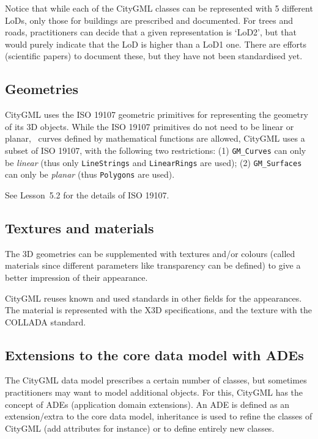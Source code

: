 %

Notice that while each of the CityGML classes can be represented with 5 different LoDs, only those for buildings are prescribed and documented.
For trees and roads, practitioners can decide that a given representation is `LoD2', but that would purely indicate that the LoD is higher than a LoD1 one.
There are efforts (scientific papers) to document these, but they have not been standardised yet.


\subsection{Geometries}

CityGML uses the ISO 19107 geometric primitives for representing the geometry of its 3D objects.
While the ISO 19107 primitives do not need to be linear or planar, \ie\ curves defined by mathematical functions are allowed, CityGML uses a subset of ISO 19107, with the following two restrictions: (1) \texttt{GM\_Curves} can only be \emph{linear} (thus only \texttt{LineStrings} and \texttt{LinearRings} are used); (2) \texttt{GM\_Surfaces} can only be \emph{planar} (thus \texttt{Polygons} are used).

See Lesson~5.2 for the details of ISO 19107.


\subsection{Textures and materials}
The 3D geometries can be supplemented with textures and/or colours (called materials since different parameters like transparency can be defined) to give a better impression of their appearance.

CityGML reuses known and used standards in other fields for the appearances.
The material is represented with the X3D specifications, and the texture with the COLLADA standard.


\subsection{Extensions to the core data model with ADEs} 

The CityGML data model prescribes a certain number of classes, but sometimes practitioners may want to model additional objects.
For this, CityGML has the concept of ADEs (application domain extensions).
An ADE is defined as an extension/extra to the core data model, inheritance is used to refine the classes of CityGML (add attributes for instance) or to define entirely new classes.

